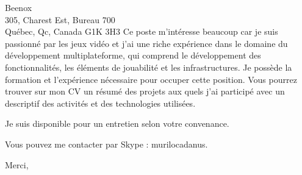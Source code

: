 \documentclass[11pt]{letter} %
\begin{document}
\begin{letter}{%
Beenox \\
305, Charest Est, Bureau 700 \\
Québec, Qc, Canada G1K 3H3}
Ce poste m'intéresse beaucoup car je suis passionné par les jeux vidéo et j'ai une riche expérience dans le domaine du développement multiplateforme, qui comprend le développement des fonctionnalités, les éléments de jouabilité et les infrastructures. Je possède la formation et l'expérience nécessaire pour occuper cette position. Vous pourrez trouver sur mon CV un résumé des projets aux quels j'ai participé avec un descriptif des activités et des technologies utilisées.

Je suis disponible pour un entretien selon votre convenance.

Vous pouvez me contacter par Skype : murilocadanus.

\closing{Merci, }


\end{letter}
\end{document}
